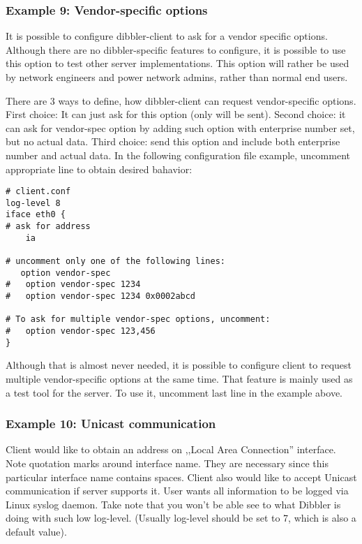 \subsubsection{Example 9: Vendor-specific options}
\label{example-client-vendor-spec}
It is possible to configure dibbler-client to ask for a vendor specific
options. Although there are no dibbler-specific features to configure,
it is possible to use this option to test other server
implementations. This option will rather be used by network engineers
and power network admins, rather than normal end users.

There are 3 ways to define, how dibbler-client can request
vendor-specific options. First choice: It can just ask for this option (only
 will be sent). Second choice: it can ask for
vendor-spec option by adding such option with enterprise number set, but
no actual data. Third choice: send this option and include both
enterprise number and actual data. In the following configuration file
example, uncomment appropriate line to obtain desired bahavior:

\begin{lstlisting}
# client.conf
log-level 8
iface eth0 {
# ask for address
    ia

# uncomment only one of the following lines:
   option vendor-spec
#   option vendor-spec 1234
#   option vendor-spec 1234 0x0002abcd

# To ask for multiple vendor-spec options, uncomment:
#   option vendor-spec 123,456
}
\end{lstlisting}

Although that is almost never needed, it is possible to configure
client to request multiple vendor-specific options at the same
time. That feature is mainly used as a test tool for the server. To
use it, uncomment last line in the example above.

\subsubsection{Example 10: Unicast communication}

Client would like to obtain an address on ,,Local Area Connection''
interface. Note quotation marks around
interface name. They are necessary since this particular interface name
contains spaces. Client also would like to accept Unicast
communication if server supports it. User wants all information
to be logged via Linux syslog daemon. Take note that you won't be
able see to what Dibbler is doing with such low log-level. (Usually
log-level should be set to 7, which is also a default value).

